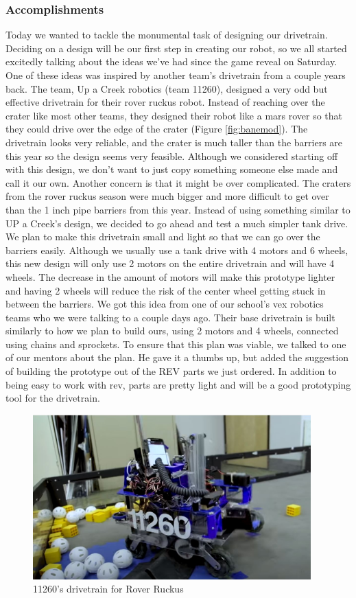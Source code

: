 \subsubsection*{Accomplishments}
Today we wanted to tackle the monumental task of designing our drivetrain. Deciding on a design will be our first step in creating our robot, so we all started excitedly talking about the ideas we’ve had since the game reveal on Saturday. One of these ideas was inspired by another team’s drivetrain from a couple years back. The team, Up a Creek robotics (team 11260), designed a very odd but effective drivetrain for their rover ruckus robot. Instead of reaching over the crater like most other teams, they designed their robot like a mars rover so that they could drive over the edge of the crater (Figure \ref{fig:banemod}). The drivetrain looks very reliable, and the crater is much taller than the barriers are this year so the design seems very feasible. Although we considered starting off with this design, we don't want to just copy something someone else made and call it our own. Another concern is that it might be over complicated. The craters from the rover ruckus season were much bigger and more difficult to get over than the 1 inch pipe barriers from this year. 
Instead of using something similar to UP a Creek’s design, we decided to go ahead and test a much simpler tank drive. We plan to make this drivetrain small and light so that we can go over the barriers easily. Although we usually use a tank drive with 4 motors and 6 wheels, this new design will only use 2 motors on the entire drivetrain and will have 4 wheels. The decrease in the amount of motors will make this prototype lighter and having 2 wheels will reduce the risk of the center wheel getting stuck in between the barriers. We got this idea from one of our school’s vex robotics teams who we were talking to a couple days ago. Their base drivetrain is built similarly to how we plan to build ours, using 2 motors and 4 wheels, connected using chains and sprockets. To ensure that this plan was viable, we talked to one of our mentors about the plan. He gave it a thumbs up, but added the suggestion of building the prototype out of the REV parts we just ordered. In addition to being easy to work with rev, parts are pretty light and will be a good prototyping tool for the drivetrain. 

\begin{figure}
\centering
\includegraphics[width=0.955\textwidth, angle=0]{Meetings/September/09-23-21/9-21-21_Hardware_Image1 - Nathan Forrer.JPG}
\caption{11260's drivetrain for Rover Ruckus}
\label{fig:pic4}
\end{figure}





